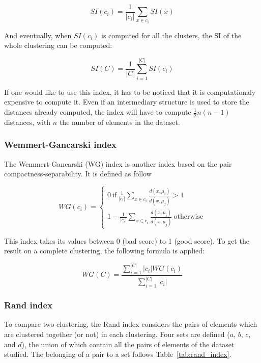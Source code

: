 \documentclass[a4paper]{report}
\begin{document}
    \begin{equation}
        SI(c_i) = \frac{1}{|c_i|}\sum_{x \in c_i} SI(x)
        \label{eq:si_ci}
    \end{equation}

    And eventually, when $SI(c_i)$ is computed for all the clusters, the SI of the whole clustering can be computed:

    \begin{equation}
        SI(C) = \frac{1}{|C|}\sum_{i=1}^{|C|} SI(c_i)
        \label{eq:si_clustering}
    \end{equation}

    If one would like to use this index, it has to be noticed that it is computationaly expensive to compute it. Even if an intermediary structure is used to store the distances already computed, the index will have to compute $\frac{1}{2}n(n-1)$ distances, with $n$ the number of elements in the dataset.
    
    \subsubsection{Wemmert-Gancarski index}
    The Wemmert-Gancarski (WG) index is another index based on the pair compactness-separability. It is defined as follow

    \begin{equation}
        WG(c_i) = 
        \begin{cases}
            0 ~ \text{if}\ \frac{1}{|c_i|}\sum_{x \in c_i} \frac{d(x,\mu_i)}{d(x, \mu_j)} > 1\\
            1 - \frac{1}{|c_i|}\sum_{x \in c_i} \frac{d(x,\mu_i)}{d(x, \mu_j)} ~ \text{otherwise}
        \end{cases}
        \label{eq:wg_index}
    \end{equation}

    This index takes its values between 0 (bad score) to 1 (good score). To get the result on a complete clustering, the following formula is applied:

    \begin{equation}
        WG(C) = \frac{\sum_{i=1}^{|C|} |c_i| WG(c_i)}{\sum_{i=1}^{|C|} |c_i|}
        \label{eq:wg_index_global}
    \end{equation}

    \subsubsection{Rand index}
    To compare two clustering, the Rand index considers the pairs of elements which are clustered together (or not) in each clustering. Four sets are defined ($a$, $b$, $c$, and $d$), the union of which contain all the pairs of elements of the dataset studied. The belonging of a pair to a set follows Table~\ref{tab:rand_index}.
    
\end{document}
